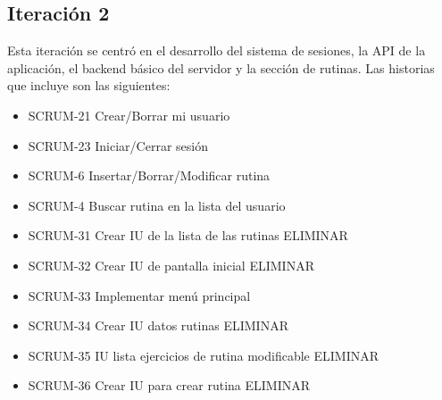 \subsection{Iteraci\'on 2}
Esta iteraci\'on se centr\'o en el desarrollo del sistema de sesiones, la API de la aplicaci\'on, el backend b\'asico del servidor y la secci\'on de rutinas. Las historias que incluye son las siguientes:

\begin{itemize}
  \item SCRUM-21 Crear/Borrar mi usuario
  \item SCRUM-23 Iniciar/Cerrar sesión
  \item SCRUM-6 Insertar/Borrar/Modificar rutina
  \item SCRUM-4 Buscar rutina en la lista del usuario
  \item SCRUM-31 Crear IU de la lista de las rutinas ELIMINAR
  \item SCRUM-32 Crear IU de pantalla inicial ELIMINAR
  \item SCRUM-33 Implementar menú principal
  \item SCRUM-34 Crear IU datos rutinas ELIMINAR
  \item SCRUM-35 IU lista ejercicios de rutina modificable ELIMINAR
  \item SCRUM-36 Crear IU para crear rutina ELIMINAR
\end{itemize}


